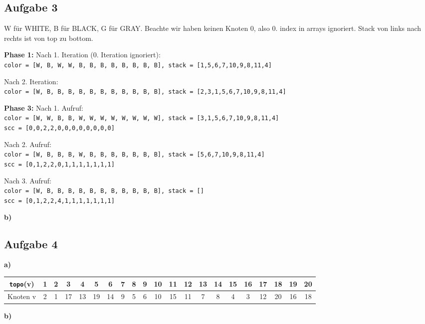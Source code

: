 \documentclass[a4paper,graphics,11pt]{article}
\newcommand{\aufgabe}[1]{\subsection*{Aufgabe #1}}
\begin{document}
\aufgabe{3}
W für WHITE, B für BLACK, G für GRAY. Beachte wir haben keinen Knoten 0, also 0. index in arrays ignoriert.
Stack von links nach rechts ist von top zu bottom.

\textbf{Phase 1:}
Nach 1. Iteration (0. Iteration ignoriert):\\
\texttt{color = [W, B, W, W, B, B, B, B, B, B, B, B], stack = [1,5,6,7,10,9,8,11,4]}

Nach 2. Iteration:\\
\texttt{color = [W, B, B, B, B, B, B, B, B, B, B, B], stack = [2,3,1,5,6,7,10,9,8,11,4]}

\textbf{Phase 3:}
Nach 1. Aufruf:\\
\texttt{color = [W, W, B, B, W, W, W, W, W, W, W, W], stack = [3,1,5,6,7,10,9,8,11,4]}\\
\texttt{scc = [0,0,2,2,0,0,0,0,0,0,0,0]}

Nach 2. Aufruf:\\
\texttt{color = [W, B, B, B, W, B, B, B, B, B, B, B], stack = [5,6,7,10,9,8,11,4]}\\
\texttt{scc = [0,1,2,2,0,1,1,1,1,1,1,1]}

Nach 3. Aufruf:\\
\texttt{color = [W, B, B, B, B, B, B, B, B, B, B, B], stack = []}\\
\texttt{scc = [0,1,2,2,4,1,1,1,1,1,1,1]}

\textbf{b)}
\begin{center}
\end{center}

\aufgabe{4}
\textbf{a)}

\begin{tabular}{c|*{19}{c|}c}
    \texttt{topo}(v) & 1 & 2 & 3 & 4 & 5 & 6 & 7 & 8 & 9 & 10 & 11 & 12 & 13 & 14 & 15 & 16 & 17 & 18 & 19 & 20\\
    \hline
    Knoten v & 2 & 1 & 17 & 13 & 19 & 14 & 9 & 5 & 6 & 10 & 15 & 11 & 7 & 8 & 4 & 3 & 12 & 20 & 16 & 18
\end{tabular}

\textbf{b)}

\end{document}
